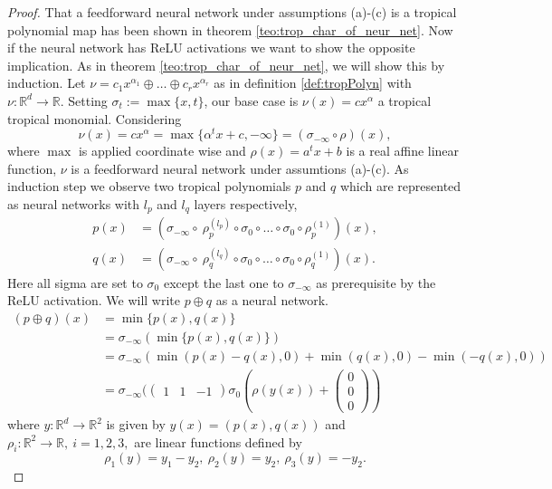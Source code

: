 \documentclass{article}
\theoremstyle{definition}
\begin{document}
\begin{proof}
That a feedforward neural network under assumptions (a)-(c) is a tropical polynomial map has been shown in theorem \ref{teo:trop_char_of_neur_net}. Now if the neural network has ReLU activations we want to show the opposite implication. As in theorem \ref{teo:trop_char_of_neur_net}, we will show this by induction. Let $\nu=c_1x^{\alpha_1} \oplus \dots \oplus c_rx^{\alpha_r}$ as in definition \ref{def:tropPolyn} with $\nu: \mathbb{R}^{d} \to \mathbb{R}$. Setting $\sigma_{t} := \max \{ x, t\}$, our base case is $\nu (x) = c x^{\alpha}$ a tropical tropical monomial. Considering
$$\nu(x) = cx^{\alpha} = \max \{ \alpha^{t}x + c, -\infty \} = (\sigma_{- \infty} \circ \rho)(x),$$
where $\max$ is applied coordinate wise and $\rho(x) = a^{t}x + b$ is a real affine linear function, $\nu$ is a feedforward neural network under assumtions (a)-(c). As induction step we observe two tropical polynomials $p$ and $q$ which are represented as neural networks with $l_{p}$ and $l_{q}$ layers respectively,
\begin{align*}
p(x) &= (\sigma_{- \infty} \circ \ \rho_{p}^{(l_{p})} \circ \sigma_{0} \circ \dots \circ \sigma_{0} \circ \rho_{p}^{(1)})(x), \\
q(x) &= (\sigma_{- \infty} \circ \ \rho_{q}^{(l_{q})} \circ \sigma_{0} \circ \dots \circ \sigma_{0} \circ \rho_{q}^{(1)})(x).
\end{align*}
Here all sigma are set to $\sigma_{0}$ except the last one to $\sigma_{- \infty}$ as prerequisite by the ReLU activation. We will write $p \oplus q$ as a neural network.
\begin{align*}
(p \oplus q)(x) 
&= \min \{ p(x), q(x) \} \\
&= \sigma_{- \infty }( \min \{ p(x), q(x) \} ) \\
&= \sigma_{- \infty }( \min(p(x)-q(x), 0) + \min(q(x), 0) - \min(-q(x), 0)) \\
&= \sigma_{- \infty }(\begin{pmatrix} 1 & 1 & -1 \end{pmatrix} \sigma_{0}(\rho(y(x)) + \begin{pmatrix} 0 \\ 0 \\ 0 \end{pmatrix})
\end{align*}
where $y:\mathbb{R}^{d} \to \mathbb{R}^{2}$ is given by $y(x)=(p(x),q(x))$ and $\rho_{i}:\mathbb{R}^{2} \to \mathbb{R}, \ i=1,2, 3,$ are linear functions defined by
$$\rho_{1}(y)=y_{1}-y_{2}, \ \rho_{2}(y)=y_{2}, \ \rho_{3}(y)= -y_{2}.$$

\end{proof}
\end{document}
